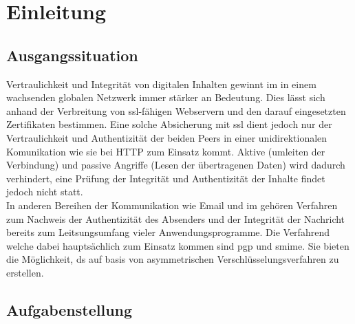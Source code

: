 \chapter{Einleitung}
%
\label{chp:einleitung}%



\section{Ausgangssituation}
%
\label{sec:einl:ausgangssituation}%

Vertraulichkeit und Integrität von digitalen Inhalten gewinnt im in einem wachsenden globalen Netzwerk immer stärker an Bedeutung. Dies lässt sich anhand der Verbreitung von \gls{ssl}-fähigen Webservern und den darauf eingesetzten Zertifikaten bestimmen. Eine solche Absicherung mit \gls{ssl} dient jedoch nur der Vertraulichkeit und Authentizität der beiden Peers in einer unidirektionalen Komunikation wie sie bei HTTP zum Einsatz kommt. Aktive (umleiten der Verbindung) und passive Angriffe (Lesen der übertragenen Daten) wird dadurch verhindert, eine Prüfung der Integrität und Authentizität der Inhalte findet jedoch nicht statt. \\
In anderen Bereihen der Kommunikation wie Email und \gls{im} gehören Verfahren zum Nachweis der Authentizität des Absenders und der Integrität der Nachricht bereits zum Leitsungsumfang vieler Anwendungsprogramme. Die Verfahrend welche dabei hauptsächlich zum Einsatz kommen sind \gls{pgp} und \gls{smime}. Sie bieten die Möglichkeit, \gls{ds} auf basis von asymmetrischen Verschlüsselungsverfahren zu erstellen.

\section{Aufgabenstellung}
%
\label{sec:einl:aufgabenstellung}%

